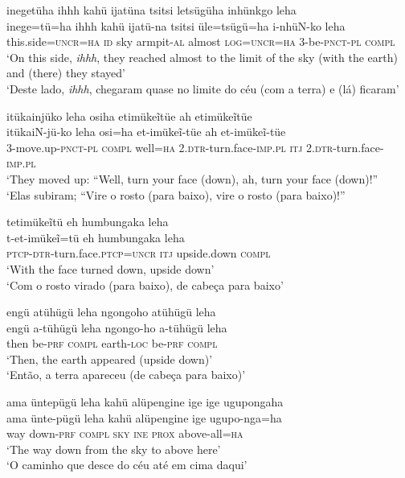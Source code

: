 \documentclass[output=paper,
modfonts,nonflat
]{langsci/langscibook}
\begin{document}
\ea inegetüha ihhh kahü ijatüna tsitsi letsügüha inhünkgo leha \\[.3em]
\gll inege=tü=ha		ihhh	kahü	ijatü-na	tsitsi	üle=tsügü=ha	i-nhüN-ko	leha \\
this.side=\textsc{uncr=ha} 	\textsc{id} 	sky 	armpit-\textsc{al} 	almost 	\textsc{log}=\textsc{uncr=ha} 3-be-\textsc{pnct-pl} \textsc{compl} \\
\glt ‘On this side, \textit{ihhh}, they reached almost to the limit of the sky (with the earth) and (there) they stayed’ \\
‘Deste lado, \textit{ihhh}, chegaram quase no limite do céu (com a terra) e (lá) ficaram’ \\
\z

\ea itükainjüko leha osiha etimükeĩtüe ah etimükeĩtüe \\[.3em]
\gll itükaiN-jü-ko		leha	osi=ha		et-imükeĩ-tüe ah	et-imükeĩ-tüe	 \\	
3-move.up-\textsc{pnct-pl} 	\textsc{compl}	well=\textsc{ha} 	2.\textsc{dtr}-turn.face-\textsc{imp.pl} \textsc{itj} 	2.\textsc{dtr}-turn.face-\textsc{imp.pl} \\
\glt ‘They moved up: “Well, turn your face (down), ah, turn your face (down)!” \\
‘Elas subiram; “Vire o rosto (para baixo), vire o rosto (para baixo)!” \\
\z

\ea tetimükeĩtü eh humbungaka leha \\[.3em]
\gll t-et-imükeĩ=tü			eh	humbungaka leha \\
\textsc{ptcp-dtr}-turn.face.\textsc{ptcp=uncr}	\textsc{itj} 	upside.down \textsc{compl} \\
\glt ‘With the face turned down, upside down’ \\
‘Com o rosto virado (para baixo), de cabeça para baixo’ \\
\z


\ea engü atühügü leha ngongoho atühügü leha \\[.3em]
\gll engü	a-tühügü	leha	ngongo-ho 	a-tühügü	leha \\
then	be-\textsc{prf}		\textsc{compl}	earth\textsc{-loc}	be-\textsc{prf}		\textsc{compl} \\
\glt ‘Then, the earth appeared (upside down)’ \\
‘Então, a terra apareceu (de cabeça para baixo)’ \\
\z

\ea ama üntepügü leha kahü alüpengine ige ige ugupongaha \\[.3em]
\gll ama	ünte-pügü	leha	kahü	alüpengine	ige 	ugupo-nga=ha \\
way 	down-\textsc{prf}	\textsc{compl}	\textsc{sky} 	\textsc{ine} 		\textsc{prox} 	above-all=\textsc{ha} \\
\glt ‘The way down from the sky to above here’ \\
‘O caminho que desce do céu até em cima daqui’ \\
\z
\end{document}

